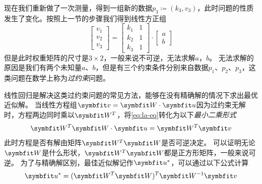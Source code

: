 现在我们重新做了一次测量，得到一组新的数据$p_3\coloneqq(k_3, v_3)$，此时问题的性质发生了变化。按照上一节的步骤我们得到线性方正组
\begin{equation}\label{eq:la-kv-3}
    \begin{bmatrix}
        v_1\\
        v_2\\
        v_3
    \end{bmatrix}=
    \begin{bmatrix}
        k_1 & 1\\
        k_2 & 1\\
        k_3 & 1
    \end{bmatrix}\cdot
    \begin{bmatrix}
        a\\
        b
    \end{bmatrix}
\end{equation}
但是此时权重矩阵的尺寸是$3\times2$，一般来说不可逆，无法求解$a$，$b$。
无法求解的原因是我们有两个未知量$a$、$b$，但是有三个约束条件分别来自数据$p_1$、$p_2$、$p_3$，这类问题在数学上称为\emph{过约束}问题。

线性回归是解决这类过约束问题的常见方法，能够在没有精确解的情况下求出最优近似解。
当线性方程组$\Vv=\MW\cdot\Vu$因为过约束无解时，方程两边同时乘以$\MW^T$，将\cref{eq:la-eq}转化为以下\emph{最小二乘形式}
\begin{equation}\label{eq:least-square}
    \MW^T\MW\cdot\Vu=\MW^T\Vv
\end{equation}
此时方程是否有解由矩阵$\MW^T\MW$是否可逆决定。
可以证明无论$\MW$是什么形状，$\MW^T\MW$都是正方形矩阵，一般来说可逆。
为了与精确解区别，最佳近似解记作$\Vu^*$，可以通过以下公式计算
\begin{equation}
    \Vu^*=(\MW^T\MW)^T\MW^{-1}\Vv
\end{equation}

